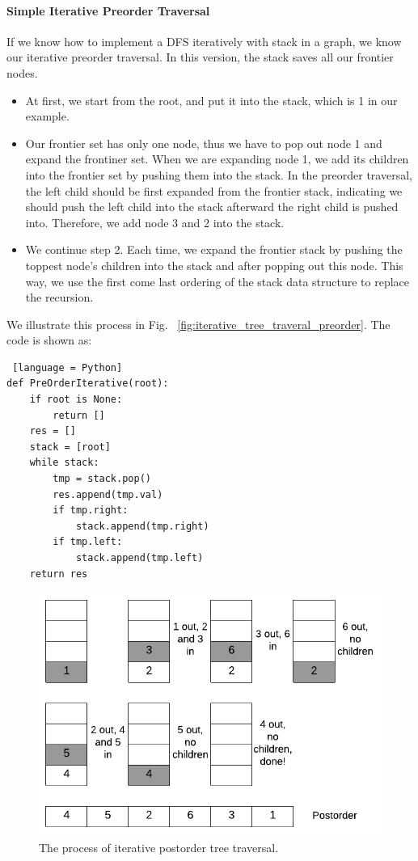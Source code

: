 \documentclass[../main.tex]{subfiles}
\begin{document}
\paragraph{Simple Iterative Preorder Traversal} If we know how to implement a DFS iteratively with stack in a graph, we know our iterative preorder traversal. In this version, the stack saves all our frontier nodes. 
\begin{itemize}
    \item At first, we start from the root, and put it into the stack, which is 1 in our example.  
    \item  Our frontier set has only one node, thus we have to pop out node 1 and expand the frontiner set. When we are expanding node 1, we add its children into the frontier set by pushing them into the stack. In the preorder traversal, the left child should be first expanded from the frontier stack, indicating we should push the left child into the stack afterward the right child is pushed into. Therefore, we add node 3 and 2 into the stack. 
    \item We continue step 2.  Each time, we expand the frontier stack by pushing the toppest node's children into the stack and after popping out this node. This way, we use the first come last ordering of the stack data structure to replace the recursion.
\end{itemize}
We illustrate this process in Fig. ~\ref{fig:iterative_tree_traveral_preorder}.  The code is shown as:
\begin{lstlisting} [language = Python]
def PreOrderIterative(root):
    if root is None:
        return []
    res = []
    stack = [root]
    while stack:
        tmp = stack.pop()
        res.append(tmp.val)
        if tmp.right:
            stack.append(tmp.right)
        if tmp.left:
            stack.append(tmp.left)
    return res
\end{lstlisting}
\begin{figure}[!ht]
    \centering
    \includegraphics[width = .9\columnwidth]{fig/iterative_tree_traversal_postorder.png}
    \caption{The process of iterative postorder tree traversal.}
    \label{fig:iterative_tree_traveral_postorder}
\end{figure}
\end{document}
